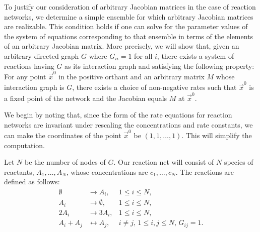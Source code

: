 To justify our consideration of arbitrary Jacobian matrices in the case of reaction networks, we determine a simple ensemble for which arbitrary Jacobian matrices are realizable. This condition holds if one can solve for the parameter values of the system of equations corresponding to that ensemble in terms of the elements of an arbitrary Jacobian matrix. More precisely, we will show that, given an arbitrary directed graph $G$ where $G_{ii} = 1$ for all $i$, there exists a system of reactions having $G$ as its interaction graph and satisfying the following property: For any point $\vec{x}^0$ in the positive orthant and an arbitrary matrix $M$ whose interaction graph is $G$, there exists a choice of non-negative rates such that $\vec{x}^0$ is a fixed point of the network and the Jacobian equals $M$ at $\vec{x}^0$.

We begin by noting that, since the form of the rate equations for reaction networks are invariant under rescaling the concentrations and rate constants, we can make the coordinates of the point $\vec{x}^0$ be $(1,1,\ldots,1)$.  This will simplify the computation.

Let $N$ be the number of nodes of $G$.  Our reaction net will consist of $N$ species of reactants, $A_1, \ldots, A_N$, whose concentrations are $c_1, \ldots, c_N$.  The reactions are defined as follows:
\begin{equation}\label{eq:arbitraryjacobianreactionnetwork}
\begin{aligned}
\emptyset &\to A_i, & 1 \le i \le N,\\
A_i &\to \emptyset, & 1 \le i \le N,\\
2A_i &\to 3A_i, & 1 \le i \le N,\\
A_i + A_j &\leftrightarrow A_j, & i \neq j,\, 1 \le i,j \le N,\, G_{ij} = 1.
\end{aligned}
\end{equation}

